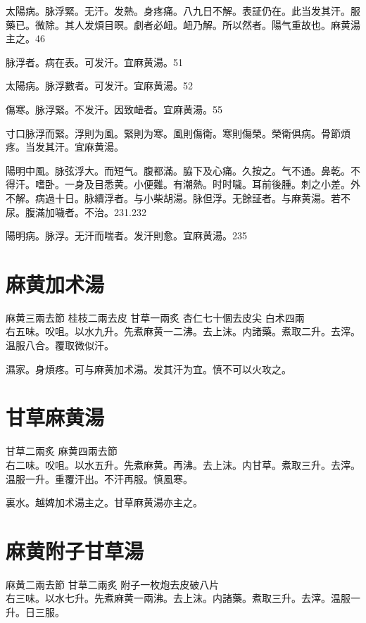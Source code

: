太陽病。脉浮緊。无汗。发熱。身疼痛。八九日不解。表証仍在。此当发其汗。服藥已。微除。其人发煩目暝。劇者必衄。衄乃解。所以然者。陽气重故也。麻黄湯主之。46

脉浮者。病在表。可发汗。宜麻黄湯。51

{\khaaitp 太陽病。}脉浮數者。可发汗。宜麻黄湯。52

傷寒。脉浮緊。不发汗。因致衄者。宜麻黄湯。55

{\khaaitp 寸口}脉浮而緊。浮則为風。緊則为寒。風則傷衛。寒則傷榮。榮衛俱病。骨節煩疼。当发其汗。{\khaaitp 宜麻黄湯。}

陽明中風。脉弦浮大。而短气。腹都滿。脇下及心痛。久按之。气不通。鼻乾。不得汗。嗜卧。一身及目悉黄。小便難。有潮熱。时时噦。耳前後腫。刺之小差。外不解。病過十日。脉續浮者。与{\khaaitp 小}柴胡湯。脉但浮。无餘証者。与麻黄湯。若不尿。腹滿加噦者。不治。231.232

陽明病。脉浮。无汗而喘者。发汗則愈。宜麻黄湯。235

\section{麻黄加术湯}

麻黄{\scriptsize 三兩去節} 桂枝{\scriptsize 二兩去皮} 甘草{\scriptsize 一兩炙} 杏仁{\scriptsize 七十個去皮尖} 白术{\scriptsize 四兩}\\
右五味。㕮咀。以水九升。先煮麻黄一二沸。去上沫。内諸藥。煮取二升。去滓。温服八合。覆取微似汗。

濕家。身煩疼。可与麻黄加术湯。发其汗为宜。慎不可以火攻之。

\section{甘草麻黄湯}

甘草{\scriptsize 二兩炙} 麻黄{\scriptsize 四兩去節}\\
右二味。㕮咀。以水五升。先煮麻黄。再沸。去上沫。内甘草。煮取三升。去滓。温服一升。重覆汗出。不汗再服。慎風寒。

裏水。越婢加术湯主之。甘草麻黄湯亦主之。

\section{麻黄附子甘草湯}

麻黄{\scriptsize 二兩去節} 甘草{\scriptsize 二兩炙} 附子{\scriptsize 一枚炮去皮破八片}\\
右三味。以水七升。先煮麻黄一兩沸。去上沫。内諸藥。煮取三升。去滓。温服一升。日三服。

